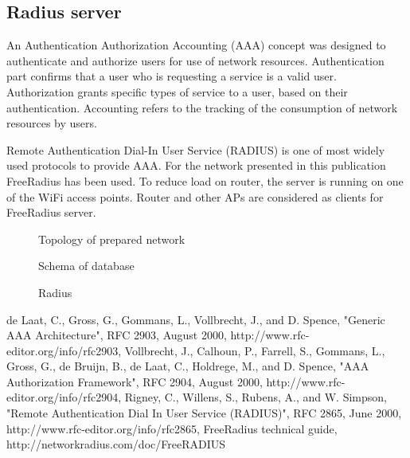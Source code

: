 \documentclass{llncs}
\begin{document}
\subsection{Radius server}
An Authentication Authorization Accounting (AAA) \cite{rfc2903}\cite{rfc2904}
concept was designed to authenticate and authorize users for use of network
resources. Authentication part confirms that a user who is requesting a service
is a valid user. Authorization grants specific types of service to a user, based
on their authentication. Accounting refers to the tracking of the consumption of
network resources by users.

Remote Authentication Dial-In User Service (RADIUS) \cite{rfc2865} is one of
most widely used protocols to provide AAA. For the network presented in this
publication FreeRadius \cite{freeRadius} has been used. To reduce load on
router, the server is running on one of the WiFi access points. Router and other
APs are considered as clients for FreeRadius server. 

\begin{figure}
\vspace{-15pt}
\caption{Topology of prepared network}
\end{figure}

\begin{figure}
\vspace{-15pt}
\caption{Schema of database}
\end{figure}

\begin{figure}
\vspace{-15pt}
\caption{Radius}
\end{figure}

%
%
\begin{thebibliography}{}
%
de Laat, C., Gross, G., Gommans, L., Vollbrecht, J., and D. Spence, "Generic AAA
Architecture", RFC 2903, August 2000, http://www.rfc-editor.org/info/rfc2903,
Vollbrecht, J., Calhoun, P., Farrell, S., Gommans, L., Gross, G., de Bruijn, B.,
de Laat, C., Holdrege, M., and D. Spence, "AAA Authorization Framework", RFC
2904, August 2000, http://www.rfc-editor.org/info/rfc2904,
Rigney, C., Willens, S., Rubens, A., and W. Simpson, "Remote  Authentication
Dial In User Service (RADIUS)", RFC 2865, June 2000,
http://www.rfc-editor.org/info/rfc2865,
FreeRadius technical guide,
http://networkradius.com/doc/FreeRADIUS%
\end{thebibliography}



\clearpage
{} %
\renewcommand{\indexname}{Author Index}
\printindex
\clearpage
{} %
\renewcommand{\indexname}{Subject Index}

\end{document}
